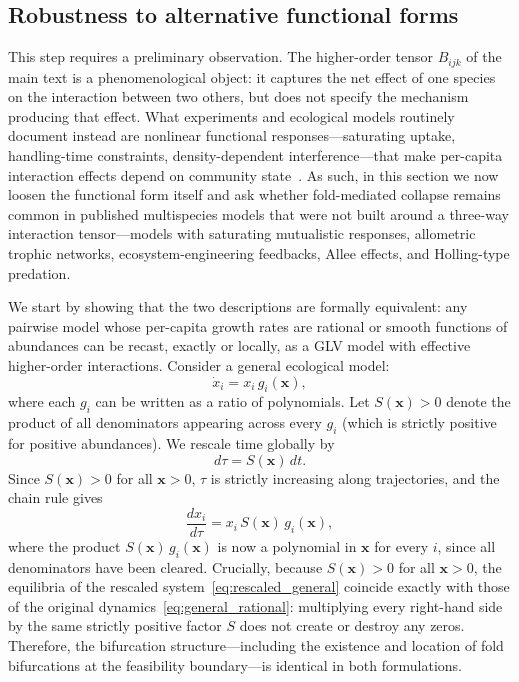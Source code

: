 \documentclass[pdflatex,sn-mathphys-num]{sn-jnl}%
\begin{document}
\subsection{Robustness to alternative functional forms}
\label{sec:si_hoi_casting}

This step requires a preliminary observation. The higher-order tensor $B_{ijk}$ of the main text is a phenomenological object: it captures the net effect of one species on the interaction between two others, but does not specify the mechanism producing that effect. What experiments and ecological models routinely document instead are nonlinear functional responses---saturating uptake, handling-time constraints, density-dependent interference---that make per-capita interaction effects depend on community state~\cite{holling_components_1959, kleinhesselink_detecting_2022}. As such, in this section we now loosen the functional form itself and ask whether fold-mediated collapse remains common in published multispecies models that were not built around a three-way interaction tensor---models with saturating mutualistic responses, allometric trophic networks, ecosystem-engineering feedbacks, Allee effects, and Holling-type predation. 

We start by showing that the two descriptions are formally equivalent: any pairwise model whose per-capita growth rates are rational or smooth functions of abundances can be recast, exactly or locally, as a GLV model with effective higher-order interactions. Consider a general ecological model:
\begin{equation}\label{eq:general_rational}
 \dot{x}_i = x_i\, g_i(\mathbf{x}),
\end{equation}
where each $g_i$ can be written as a ratio of polynomials. Let $S(\mathbf{x}) > 0$ denote the product of all denominators appearing across every $g_i$ (which is strictly positive for positive abundances). We rescale time globally by
\begin{equation*}
 d\tau = S(\mathbf{x})\,dt.
\end{equation*}
Since $S(\mathbf{x}) > 0$ for all $\mathbf{x} > 0$, $\tau$ is strictly increasing along trajectories, and the chain rule gives
\begin{equation}
 \frac{dx_i}{d\tau} = x_i\, S(\mathbf{x})\, g_i(\mathbf{x}),
 \label{eq:rescaled_general}
\end{equation}
where the product $S(\mathbf{x})\, g_i(\mathbf{x})$ is now a polynomial in $\mathbf{x}$ for every $i$, since all denominators have been cleared. Crucially, because $S(\mathbf{x}) > 0$ for all $\mathbf{x} > 0$, the equilibria of the rescaled system~\eqref{eq:rescaled_general} coincide exactly with those of the original dynamics~\eqref{eq:general_rational}: multiplying every right-hand side by the same strictly positive factor $S$ does not create or destroy any zeros. Therefore, the bifurcation structure---including the existence and location of fold bifurcations at the feasibility boundary---is identical in both formulations.
\end{document}
